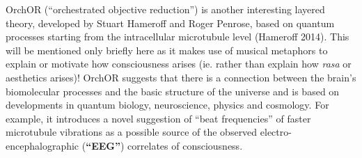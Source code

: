 


OrchOR (“orchestrated objective reduction”) is another interesting layered theory, developed by Stuart Hameroff and Roger Penrose, based on quantum processes starting from the intracellular microtubule level (Hameroff 2014). This will be mentioned only briefly here as it makes use of musical metaphors to explain or motivate how consciousness arises (ie. rather than explain how \textsl{rasa} or aesthetics arises)! OrchOR suggests that there is a connection between the brain’s biomolecular processes and the basic structure of the universe and is based on developments in quantum biology, neuroscience, physics and cosmology. For example, it introduces a novel suggestion of “beat frequencies” of faster microtubule vibrations as a possible source of the observed electro-encephalographic (\textbf{“EEG”}) correlates of consciousness.

